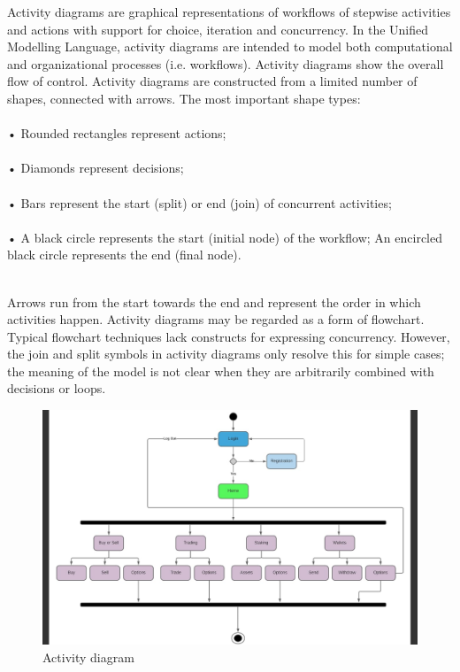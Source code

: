 \documentclass[12pt]{article}
\begin{document}
Activity diagrams are graphical representations of workflows of stepwise
activities and actions with support for choice, iteration and concurrency. In the
Unified Modelling Language, activity diagrams are intended to model both
computational and organizational processes (i.e. workflows). Activity diagrams
show the overall flow of control. Activity diagrams are constructed from a limited
number of shapes, connected with arrows. The most important shape types:
\\
\\
• Rounded rectangles represent actions;\\
\\
• Diamonds represent decisions;\\
\\
• Bars represent the start (split) or end (join) of concurrent activities;\\
\\
• A black circle represents the start (initial node) of the workflow; An encircled
black circle represents the end (final node).\\
\\
\par Arrows run from the start towards the end and represent the order in
which activities happen. Activity diagrams may be regarded as a form of
flowchart. Typical flowchart techniques lack constructs for expressing concurrency.
However, the join and split symbols in activity diagrams only resolve this
for simple cases; the meaning of the model is not clear when they are arbitrarily
combined with decisions or loops.

\newpage
\vspace*{10px}
\begin{figure}[h!]
\begin{center}
\includegraphics[scale=.99]{ACT}
\caption{Activity diagram }
\end{center}
\end{figure}
\end{document}
